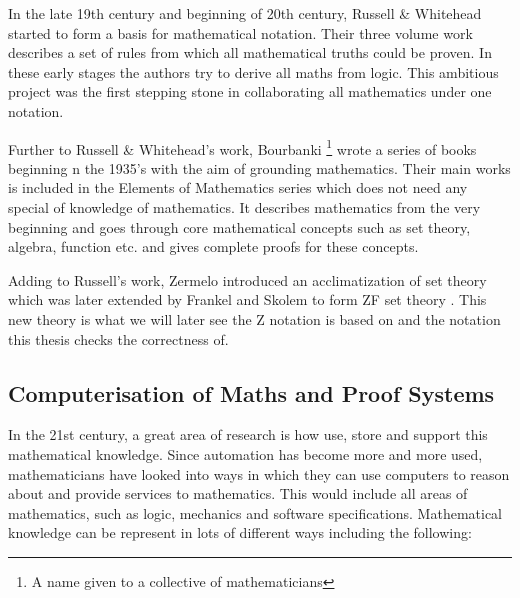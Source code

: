 In the late 19th century and beginning of 20th century, Russell \& Whitehead
\cite{whitehead1912principia} started to form a basis for mathematical notation.
Their three volume work describes a set of rules from which all mathematical
truths could be proven. In these early stages the authors try to derive all
maths from logic. This ambitious project was the first stepping stone in
collaborating all mathematics under one notation.

Further to Russell \& Whitehead's work, Bourbanki \footnote{A name given to a
collective of mathematicians} wrote a series of books beginning n the 1935's
with the aim of grounding mathematics. Their main works is included in the
Elements of Mathematics series \cite{opac-b1128208} which does not need any
special of knowledge of mathematics. It describes mathematics from the very
beginning and goes through core mathematical concepts such as set theory,
algebra, function etc. and gives complete proofs for these concepts.

Adding to Russell's work, Zermelo introduced an acclimatization of set theory
which was later extended by Frankel and Skolem to form ZF set theory \cite{zfc}.
This new theory is what we will later see the Z notation is based on and the
notation this thesis checks the correctness of.

\subsection{Computerisation of Maths and Proof Systems}

In the 21st century, a great area of research is how use, store and support this
mathematical knowledge. Since automation has become more and more used,
mathematicians have looked into ways in which they can use computers to reason
about and provide services to mathematics. This would include all areas of
mathematics, such as logic, mechanics and software specifications. Mathematical
knowledge can be represent in lots of different ways including the following:

